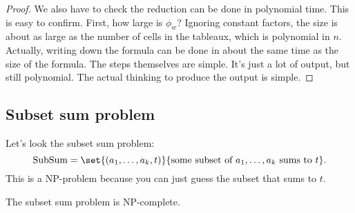 \begin{proof}
We also have to check the reduction can be done in polynomial time. This is easy to confirm.  First, how large is $\phi_w$? Ignoring constant factors, the size is about as large as the number of cells in the tableaux, which is polynomial in $n$. Actually, writing down the formula can be done in about the same time as the size of the formula. The steps themselves are simple. It's just a lot of output, but still polynomial. The actual thinking to produce the output is simple. 
\end{proof}
\subsection{Subset sum problem}
Let's look the subset sum problem:
\[
\text{SubSum}=\set{(a_1,\ldots, a_k,t)}{\text{some subset of }a_1,\ldots, a_k\text{ sums to }t}.
\]
This is a NP-problem because you can just guess the subset that sums to $t$.
\begin{thm}
The subset sum problem is NP-complete.
\end{thm}
